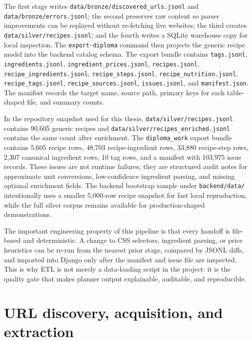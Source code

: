 The first stage writes \texttt{data/bronze/discovered\_urls.jsonl} and \texttt{data/bronze/errors.jsonl}; the second preserves raw content so parser improvements can be replayed without re-fetching live websites; the third creates \texttt{data/silver/recipes.jsonl}; and the fourth writes a SQLite warehouse copy for local inspection. The \texttt{export-diploma} command then projects the generic recipe model into the backend catalog schema. The export bundle contains \texttt{tags.jsonl}, \texttt{ingredients.jsonl}, \texttt{ingredient\_prices.jsonl}, \texttt{recipes.jsonl}, \texttt{recipe\_ingredients.jsonl}, \texttt{recipe\_steps.jsonl}, \texttt{recipe\_nutrition.jsonl}, \texttt{recipe\_tags.jsonl}, \texttt{recipe\_sources.jsonl}, \texttt{issues.jsonl}, and \texttt{manifest.json}. The manifest records the target name, source path, primary keys for each table-shaped file, and summary counts.

In the repository snapshot used for this thesis, \texttt{data/silver/recipes.jsonl} contains 90{,}605 generic recipes and \texttt{data/silver/recipes\_enriched.jsonl} contains the same count after enrichment. The \texttt{diploma\_work} export bundle contains 5{,}605 recipe rows, 48{,}703 recipe-ingredient rows, 33{,}880 recipe-step rows, 2{,}307 canonical ingredient rows, 10 tag rows, and a manifest with 103{,}975 issue records. These issues are not runtime failures; they are structured audit notes for approximate unit conversions, low-confidence ingredient parsing, and missing optional enrichment fields. The backend bootstrap sample under \texttt{backend/data/} intentionally uses a smaller 5{,}000-row recipe snapshot for fast local reproduction, while the full silver corpus remains available for production-shaped demonstrations.

The important engineering property of this pipeline is that every handoff is file-based and deterministic. A change to CSS selectors, ingredient parsing, or price heuristics can be re-run from the nearest prior stage, compared by JSONL diffs, and imported into Django only after the manifest and issue file are inspected. This is why ETL is not merely a data-loading script in the project: it is the quality gate that makes planner output explainable, auditable, and reproducible.

\section{URL discovery, acquisition, and extraction}

